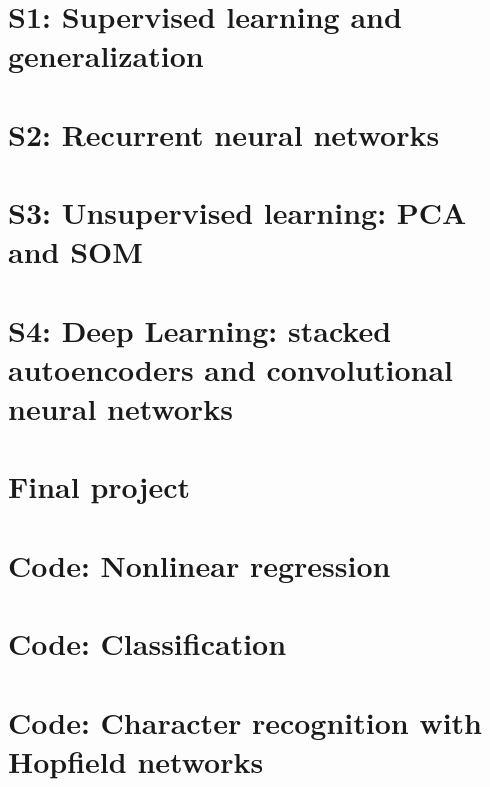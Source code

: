 \documentclass[a4paper,12pt]{article}
\begin{document}
\setlength\parindent{0pt}



\tableofcontents

\newpage
\section{S1: Supervised learning and generalization}


\newpage
\section{S2: Recurrent neural networks}


\newpage
\section{S3: Unsupervised learning: PCA and SOM}


\newpage
\section{S4: Deep Learning: stacked autoencoders and convolutional neural networks}


\newpage
\section{Final project}



\newpage
\appendix
\section{Code: Nonlinear regression}

\section{Code: Classification}

\section{Code: Character recognition with Hopfield networks}



\end{document}
